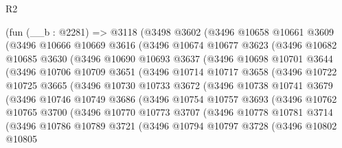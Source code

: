 \begin{lexlean}{R2}
\begin{coremodule}
    (fun (__b : @2281) =>
    @3118
      (@3498
        @3602
        (@3496
          @10658
          @10661
          @3609
          (@3496
            @10666
            @10669
            @3616
            (@3496
              @10674
              @10677
              @3623
              (@3496
                @10682
                @10685
                @3630
                (@3496
                  @10690
                  @10693
                  @3637
                  (@3496
                    @10698
                    @10701
                    @3644
                    (@3496
                      @10706
                      @10709
                      @3651
                      (@3496
                        @10714
                        @10717
                        @3658
                        (@3496
                          @10722
                          @10725
                          @3665
                          (@3496
                            @10730
                            @10733
                            @3672
                            (@3496
                              @10738
                              @10741
                              @3679
                              (@3496
                                @10746
                                @10749
                                @3686
                                (@3496
                                  @10754
                                  @10757
                                  @3693
                                  (@3496
                                    @10762
                                    @10765
                                    @3700
                                    (@3496
                                      @10770
                                      @10773
                                      @3707
                                      (@3496
                                        @10778
                                        @10781
                                        @3714
                                        (@3496
                                          @10786
                                          @10789
                                          @3721
                                          (@3496
                                            @10794
                                            @10797
                                            @3728
                                            (@3496
                                              @10802
                                              @10805

\end{coremodule}
\end{lexlean}
